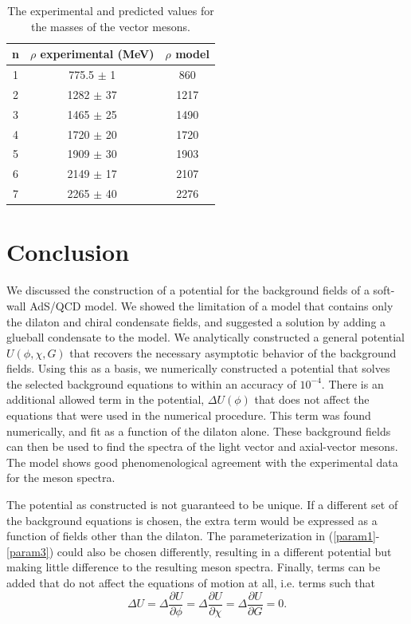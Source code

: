 \documentclass[12pt]{article}
\newcommand{\be}{\begin{equation}}
\newcommand{\ee}{\end{equation}}
\begin{document}
\begin{table}[htb]
\center
\begin{tabular}{| c || c | c  |}
\hline
n & $\rho$ experimental (MeV) & $\rho$ model \\
\hline
1 & 775.5 $\pm$  1 & 860	\\
2 & 1282 $\pm$ 37 & 1217 \\
3 & 1465 $\pm$ 25 & 1490 \\
4 &  1720 $\pm$ 20 & 1720 \\ 
5 &  1909 $\pm$ 30 & 1903 \\
6 &  2149 $\pm$  17& 2107 \\
7 &  2265 $\pm$  40& 2276 \\ 
\hline
\end{tabular}
\caption{The experimental and predicted values for the masses of the vector mesons.}
\label{tabRho}
\end{table}

\section{Conclusion}

We discussed the construction of a potential for the background fields of a soft-wall AdS/QCD model. 
We showed the limitation of a model that contains only the dilaton and chiral condensate fields, and suggested a solution by adding a glueball condensate to the model.
We analytically constructed a general potential $U(\phi,\chi,G)$ that recovers the necessary asymptotic behavior of the background fields.
Using this as a basis, we numerically constructed a potential that solves the selected background equations to within an accuracy of $10^{-4}$. 
There is an additional allowed term in the  potential, $\Delta U(\phi)$ that does not affect the equations that were used in the numerical procedure. 
This term was found numerically, and fit as a function of the dilaton alone.
These background fields can then be used to find the spectra of the light vector and axial-vector mesons.
The model shows good phenomenological agreement with the experimental data for the meson spectra.

The potential as constructed is not guaranteed to be unique.
If a different set of the background equations is chosen, the extra term would be expressed as a function of fields other than the dilaton.
The parameterization in (\ref{param1}-\ref{param3}) could also be chosen differently, resulting in a different potential but making little difference to the resulting meson spectra.
Finally, terms can be added that do not affect the equations of motion at all, i.e. terms such that 
\be
\Delta U = \Delta \frac{\partial U}{\partial \phi} = \Delta \frac{\partial U}{\partial \chi} = \Delta \frac{\partial U}{\partial G} =0.
\ee
\end{document}
